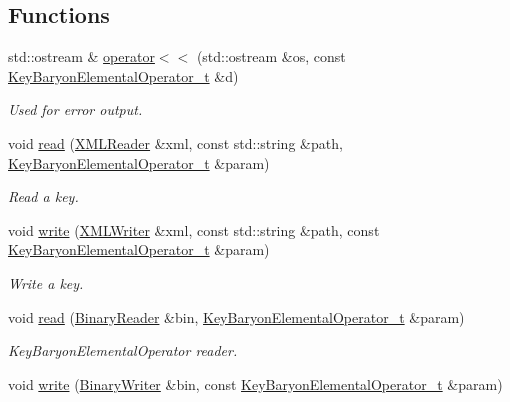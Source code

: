 \subsection*{Functions}
\begin{DoxyCompactItemize}
\item 
std\+::ostream \& \mbox{\hyperlink{namespaceHadron_aa9e7054b51bfae4b2afe5aeb8f904b2b}{operator$<$$<$}} (std\+::ostream \&os, const \mbox{\hyperlink{structHadron_1_1KeyBaryonElementalOperator__t}{Key\+Baryon\+Elemental\+Operator\+\_\+t}} \&d)
\begin{DoxyCompactList}\small\item\em Used for error output. \end{DoxyCompactList}\item 
void \mbox{\hyperlink{namespaceHadron_a61520b9a5ce2b207d1c01e1508a5c470}{read}} (\mbox{\hyperlink{classADATXML_1_1XMLReader}{X\+M\+L\+Reader}} \&xml, const std\+::string \&path, \mbox{\hyperlink{structHadron_1_1KeyBaryonElementalOperator__t}{Key\+Baryon\+Elemental\+Operator\+\_\+t}} \&param)
\begin{DoxyCompactList}\small\item\em Read a key. \end{DoxyCompactList}\item 
void \mbox{\hyperlink{namespaceHadron_ac358b1203bd94f6b26452402911ce174}{write}} (\mbox{\hyperlink{classADATXML_1_1XMLWriter}{X\+M\+L\+Writer}} \&xml, const std\+::string \&path, const \mbox{\hyperlink{structHadron_1_1KeyBaryonElementalOperator__t}{Key\+Baryon\+Elemental\+Operator\+\_\+t}} \&param)
\begin{DoxyCompactList}\small\item\em Write a key. \end{DoxyCompactList}\item 
void \mbox{\hyperlink{namespaceHadron_afb941d679afa3b1d65ca3048b28bc78c}{read}} (\mbox{\hyperlink{classADATIO_1_1BinaryReader}{Binary\+Reader}} \&bin, \mbox{\hyperlink{structHadron_1_1KeyBaryonElementalOperator__t}{Key\+Baryon\+Elemental\+Operator\+\_\+t}} \&param)
\begin{DoxyCompactList}\small\item\em Key\+Baryon\+Elemental\+Operator reader. \end{DoxyCompactList}\item 
void \mbox{\hyperlink{namespaceHadron_a4c0a824fa457c4fbaac034c83f5554c5}{write}} (\mbox{\hyperlink{classADATIO_1_1BinaryWriter}{Binary\+Writer}} \&bin, const \mbox{\hyperlink{structHadron_1_1KeyBaryonElementalOperator__t}{Key\+Baryon\+Elemental\+Operator\+\_\+t}} \&param)

\end{DoxyCompactItemize}
